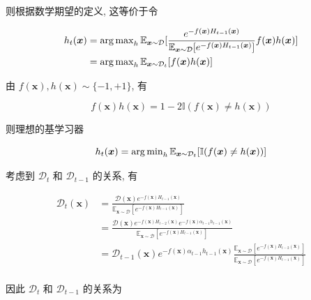 \documentclass[answers]{exam}  %
\begin{document}
\begin{questions}
\begin{solution}
\begin{enumerate}
            则根据数学期望的定义, 这等价于令

            $$
              \begin{aligned}
                h_{t}(\bm{x}) & = \operatorname{arg\,max}_{h} \mathbb{E}_{\bm{x}\sim \mathcal{D}}[\frac{e^{-f(\bm{x})H_{t-1}(\bm{x})}}{\mathbb{E}_{\bm{x}\sim \mathcal{D}}[e^{-f(\bm{x})H_{t-1}(\bm{x})}]}f(\bm{x})h(\bm{x})] \\
                              & = \operatorname{arg\,max}_{h} \mathbb{E}_{\bm{x}\sim \mathcal{D}_{t}}[f(\bm{x})h(\bm{x})]                                                                                                     \\
              \end{aligned}
            $$

            由 $f(\bm{x}), h(\bm{x}) \sim \{ -1, +1 \}$, 有

            $$
              f(\bm{x})h(\bm{x}) = 1-2\mathbb{I}(f(\bm{x}) \neq h(\bm{x}))
            $$

            则理想的基学习器

            $$
              h_{t}(\bm{x}) = \operatorname{arg\,min}_{h}\mathbb{E}_{\bm{x}\sim \mathcal{D}_{t}}[\mathbb{I}(f(\bm{x}) \neq h(\bm{x}))]
            $$

            考虑到 $\mathcal{D}_{t}$ 和 $\mathcal{D}_{t-1}$ 的关系, 有

            $$
              \begin{aligned}
                \mathcal{D}_{t}(\bm{x}) & = \frac{\mathcal{D}(\bm{x})e^{-f(\bm{x})H_{t-1}(\bm{x})}}{\mathbb{E}_{\bm{x}\sim \mathcal{D}}[e^{-f(\bm{x})H_{t-1}(\bm{x})}]}                                                                                     \\
                                        & = \frac{\mathcal{D}(\bm{x})e^{-f(\bm{x})H_{t-2}(\bm{x})}e^{-f(\bm{x})\alpha_{t-1}h_{t-1}(\bm{x})}}{\mathbb{E}_{\bm{x}\sim \mathcal{D}}[e^{-f(\bm{x})H_{t-1}(\bm{x})}]}                                            \\
                                        & = \mathcal{D}_{t-1}(\bm{x})e^{-f(\bm{x})\alpha_{t-1}h_{t-1}(\bm{x})}\frac{\mathbb{E}_{\bm{x}\sim \mathcal{D}}[e^{-f(\bm{x})H_{t-2}(\bm{x})}]}{\mathbb{E}_{\bm{x}\sim \mathcal{D}}[e^{-f(\bm{x})H_{t-1}(\bm{x})}]} \\
              \end{aligned}
            $$

            因此 $\mathcal{D}_{t}$ 和 $\mathcal{D}_{t-1}$ 的关系为


\end{enumerate}
\end{solution}
\end{questions}
\end{document}
